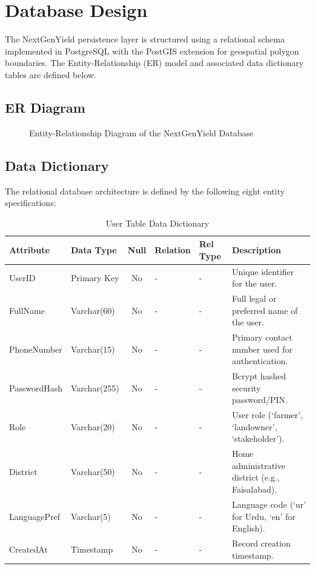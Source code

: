 \clearpage
\section{Database Design}
The NextGenYield persistence layer is structured using a relational schema implemented in PostgreSQL with the PostGIS extension for geospatial polygon boundaries. The Entity-Relationship (ER) model and associated data dictionary tables are defined below.

\subsection{ER Diagram}
\begin{figure}[H]
\centering
{}
\caption{Entity-Relationship Diagram of the NextGenYield Database}
\label{fig:er_diagram}
\end{figure}

\subsection{Data Dictionary}
The relational database architecture is defined by the following eight entity specifications:

\begin{table}[H]
\footnotesize
\centering
\caption{User Table Data Dictionary}
\label{tab:user_table}
\begin{tabular}{|l|l|c|l|l|p{4.5cm}|}
\hline
\textbf{Attribute} & \textbf{Data Type} & \textbf{Null} & \textbf{Relation} & \textbf{Rel Type} & \textbf{Description} \\ \hline
UserID & Primary Key & No & - & - & Unique identifier for the user. \\ \hline
FullName & Varchar(60) & No & - & - & Full legal or preferred name of the user. \\ \hline
PhoneNumber & Varchar(15) & No & - & - & Primary contact number used for authentication. \\ \hline
PasswordHash & Varchar(255) & No & - & - & Bcrypt hashed security password/PIN. \\ \hline
Role & Varchar(20) & No & - & - & User role (`farmer', `landowner', `stakeholder'). \\ \hline
District & Varchar(50) & No & - & - & Home administrative district (e.g., Faisalabad). \\ \hline
LanguagePref & Varchar(5) & No & - & - & Language code (`ur' for Urdu, `en' for English). \\ \hline
CreatedAt & Timestamp & No & - & - & Record creation timestamp. \\ \hline
\end{tabular}
\end{table}

